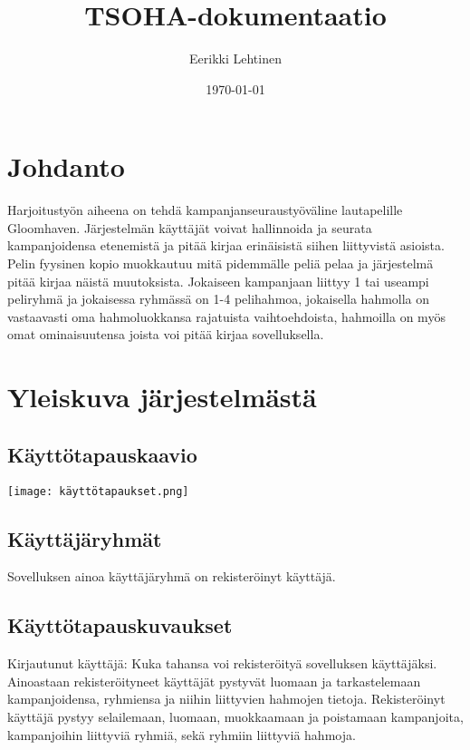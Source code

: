 \documentclass[a4paper, 10pt]{article}
\title{TSOHA-dokumentaatio}%
\author{Eerikki Lehtinen}%
\date{\today}%
\begin{document}
\maketitle
	\section*{Johdanto}Harjoitustyön aiheena on tehdä kampanjanseuraustyöväline lautapelille Gloomhaven. Järjestelmän käyttäjät voivat hallinnoida ja seurata kampanjoidensa etenemistä ja pitää kirjaa erinäisistä siihen liittyvistä asioista. Pelin fyysinen kopio muokkautuu mitä pidemmälle peliä pelaa ja järjestelmä pitää kirjaa näistä muutoksista. Jokaiseen kampanjaan liittyy 1 tai useampi peliryhmä ja jokaisessa ryhmässä on 1-4 pelihahmoa, jokaisella hahmolla on vastaavasti oma hahmoluokkansa rajatuista vaihtoehdoista, hahmoilla on myös omat ominaisuutensa joista voi pitää kirjaa sovelluksella.
	\section*{Yleiskuva järjestelmästä}
		\subsection*{Käyttötapauskaavio}
			\texttt{[image: käyttötapaukset.png]}
		\subsection*{Käyttäjäryhmät}
			Sovelluksen ainoa käyttäjäryhmä on rekisteröinyt käyttäjä.
		\subsection*{Käyttötapauskuvaukset}
			Kirjautunut käyttäjä:
			Kuka tahansa voi rekisteröityä sovelluksen käyttäjäksi. Ainoastaan rekisteröityneet käyttäjät pystyvät luomaan ja tarkastelemaan kampanjoidensa, ryhmiensa ja niihin liittyvien hahmojen tietoja. Rekisteröinyt käyttäjä pystyy selailemaan,  luomaan, muokkaamaan ja poistamaan kampanjoita, kampanjoihin liittyviä ryhmiä, sekä ryhmiin liittyviä hahmoja.
\end{document}
